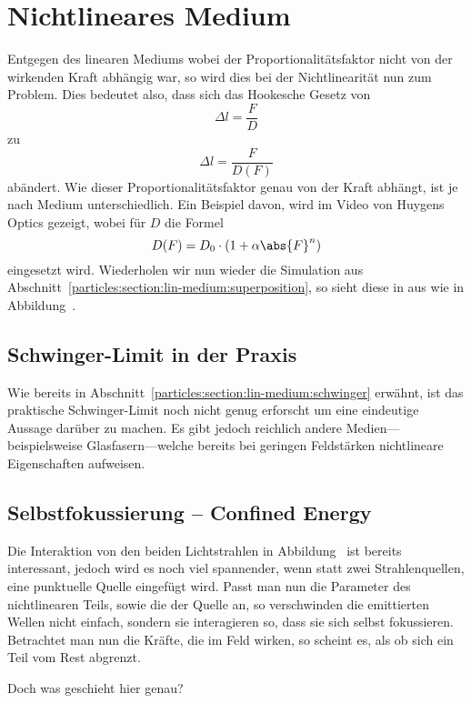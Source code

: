 %
%
%
%
\section{Nichtlineares Medium
\label{particles:section:nichtlinear}}
Entgegen des linearen Mediums wobei der Proportionalitätsfaktor nicht von der wirkenden Kraft abhängig war, 
so wird dies bei der Nichtlinearität nun zum Problem.
Dies bedeutet also, dass sich das Hookesche Gesetz von 
\[
    \Delta l
    = 
    \frac{F}{D}
\]
zu
\[
    \Delta l
    = 
    \frac{F}{D(F)}
\]
abändert. 
Wie dieser Proportionalitätsfaktor genau von der Kraft abhängt, 
ist je nach Medium unterschiedlich.
Ein Beispiel davon, wird im Video  von Huygens Optics gezeigt,
wobei für $D$ die Formel 
\[
    D(F)
    =
    D_0
    \cdot
    (1 + \alpha \abs{F}^n)
\]
eingesetzt wird.
Wiederholen wir nun wieder die Simulation aus Abschnitt~\ref{particles:section:lin-medium:superposition}, 
so sieht diese in aus wie in Abbildung~.


\subsection{Schwinger-Limit in der Praxis}
Wie bereits in Abschnitt~\ref{particles:section:lin-medium:schwinger} erwähnt, 
ist das praktische Schwinger-Limit noch nicht genug erforscht um eine eindeutige Aussage darüber zu machen.
Es gibt jedoch reichlich andere Medien---beispielsweise Glasfasern---welche bereits bei geringen Feldstärken nichtlineare Eigenschaften aufweisen.


\subsection{Selbstfokussierung -- Confined Energy}
Die Interaktion von den beiden Lichtstrahlen in Abbildung~
ist bereits interessant, jedoch wird es noch viel spannender, 
wenn statt zwei Strahlenquellen, eine punktuelle Quelle eingefügt wird.
Passt man nun die Parameter des nichtlinearen Teils, sowie die der Quelle an, 
so verschwinden die emittierten Wellen nicht einfach, 
sondern sie interagieren so, dass sie sich selbst fokussieren.
Betrachtet man nun die Kräfte, die im Feld wirken, 
so scheint es, als ob sich ein Teil vom Rest abgrenzt.

Doch was geschieht hier genau? 

